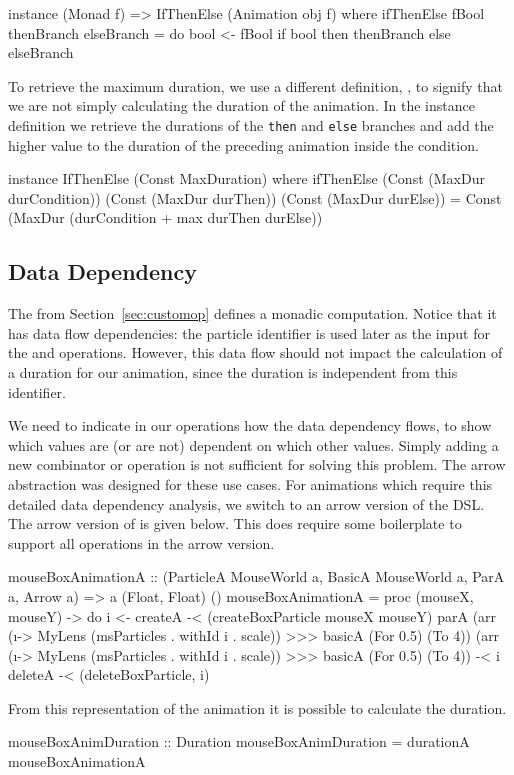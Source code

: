 \begin{code}
instance (Monad f) => IfThenElse (Animation obj f) where
  ifThenElse fBool thenBranch elseBranch = do
    bool <- fBool
    if bool then thenBranch else elseBranch
\end{code}

To retrieve the maximum duration, we use a different  definition, , to signify that we are not simply calculating the duration of the animation. In the instance definition we retrieve the durations of the \texttt{then} and \texttt{else} branches and add the higher value to the duration of the preceding animation inside the condition.

\begin{code}
 instance IfThenElse (Const MaxDuration) where
   ifThenElse (Const (MaxDur durCondition))
              (Const (MaxDur durThen))
              (Const (MaxDur durElse)) =
   Const (MaxDur (durCondition + max durThen durElse))
\end{code}

\subsection{Data Dependency}

The  from Section~\ref{sec:customop} defines a monadic computation. Notice that it has data flow dependencies: the particle identifier  is used later as the input for the  and  operations. However, this data flow should not impact the calculation of a duration for our animation, since the duration is independent from this identifier.

We need to indicate in our operations how the data dependency flows, to show which values are (or are not) dependent on which other values. Simply adding a new combinator or operation is not sufficient for solving this problem. The arrow abstraction \cite{DBLP:journals/scp/Hughes00} was designed for these use cases. For animations which require this detailed data dependency analysis, we switch to an arrow version of the DSL. The arrow version of  is given below. This does require some boilerplate to support all operations in the arrow version.

\begin{code}
mouseBoxAnimationA ::
  (ParticleA MouseWorld a,
   BasicA MouseWorld a, ParA a, Arrow a) =>
   a (Float, Float) ()
mouseBoxAnimationA = proc (mouseX, mouseY) -> do
  i <- createA -< (createBoxParticle mouseX mouseY)
  parA (arr (\i -> MyLens (msParticles . withId i . scale))
        >>> basicA (For 0.5) (To 4))
       (arr (\i -> MyLens (msParticles . withId i . scale))
        >>> basicA (For 0.5) (To 4)) -< i
  deleteA -< (deleteBoxParticle, i)
\end{code}

From this representation of the animation it is possible to calculate the duration.

\begin{code}
mouseBoxAnimDuration :: Duration
mouseBoxAnimDuration = durationA mouseBoxAnimationA
\end{code}
